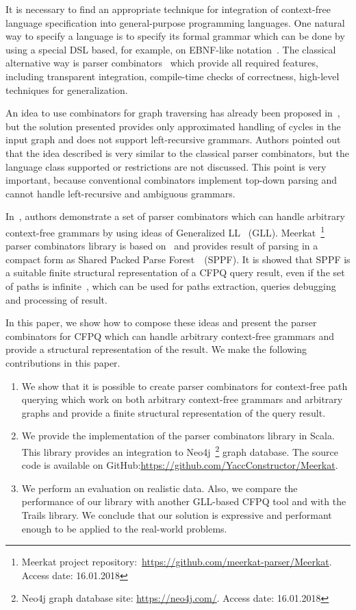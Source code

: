 It is necessary to find an appropriate technique for integration of context-free language specification into general-purpose programming languages.
One natural way to specify a language is to specify its formal grammar which can be done by using a special DSL based, for example, on EBNF-like notation~\cite{EBNFISO}.
The classical alternative way is parser combinators~\cite{MonadicPArserCombinators} which provide all required features, including transparent integration, compile-time checks of correctness, high-level techniques for generalization.

An idea to use combinators for graph traversing has already been proposed in~\cite{ScalaGraphParsing}, but the solution presented provides only approximated handling of cycles in the input graph and does not support left-recursive grammars. 
Authors pointed out that the idea described is very similar to the classical parser combinators, but the language class supported or restrictions are not discussed.
This point is very important, because conventional combinators implement top-down parsing and cannot handle left-recursive and ambiguous grammars.

In~\cite{Meerkat}, authors demonstrate a set of parser combinators which can handle arbitrary context-free grammars by using ideas of Generalized LL~\cite{scott2010gll} (GLL).
Meerkat~\footnote{Meerkat project repository:~\url{https://github.com/meerkat-parser/Meerkat}. Access date: 16.01.2018} parser combinators library is based on~\cite{Meerkat}
 and provides result of parsing in a compact form as Shared Packed Parse Forest~\cite{SPPF}~(SPPF).
It is showed that SPPF is a suitable finite structural representation of a CFPQ query result, even if the set of paths is infinite~\cite{GrigorevR16}, which can be used for paths extraction, queries debugging and processing of result.

In this paper, we show how to compose these ideas and present the parser combinators for CFPQ which can handle arbitrary context-free grammars and provide a structural representation of the result.
We make the following contributions in this paper.

\begin{enumerate}
\item We show that it is possible to create parser combinators for context-free path querying which work on both arbitrary context-free grammars and arbitrary graphs and provide a finite structural representation of the query result.
\item We provide the implementation of the parser combinators library in Scala. This library provides an integration to Neo4j~\footnote{Neo4j graph database site: \url{https://neo4j.com/}. Access date: 16.01.2018} graph database. The source code is available on GitHub:\url{https://github.com/YaccConstructor/Meerkat}.
\item We perform an evaluation on realistic data. 
Also, we compare the performance of our library with another GLL-based CFPQ tool and with the Trails library.
We conclude that our solution is expressive and performant enough to be applied to the real-world problems. 
\end{enumerate}